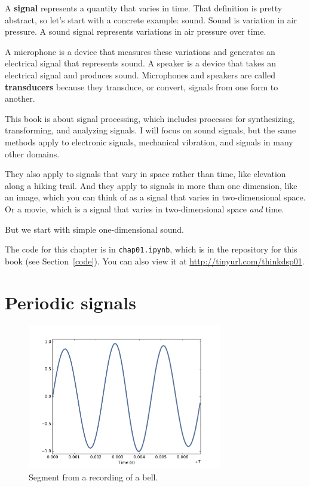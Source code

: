 \documentclass[12pt]{book}
\begin{document}
A {\bf signal} represents a quantity that varies in time.  That
definition is pretty abstract, so let's start with a concrete example:
sound.  Sound is variation in air pressure.  A sound signal represents
variations in air pressure over time.

A microphone is a device that measures these variations and generates
an electrical signal that represents sound.  A speaker is a device
that takes an electrical signal and produces sound.
Microphones and speakers are called {\bf transducers} because they
transduce, or convert, signals from one form to another.

This book is about signal processing, which includes processes for
synthesizing, transforming, and analyzing signals.  I will focus on
sound signals, but the same methods apply to electronic signals,
mechanical vibration, and signals in many other domains.

They also apply to signals that vary in space rather than time, like
elevation along a hiking trail.  And they apply to signals in more
than one dimension, like an image, which you can think of as a signal
that varies in two-dimensional space.  Or a movie, which is
a signal that varies in two-dimensional space {\it and} time.

But we start with simple one-dimensional sound.

The code for this chapter is in {\tt chap01.ipynb}, which is in the
repository for this book (see Section~\ref{code}).
You can also view it at \url{http://tinyurl.com/thinkdsp01}.


\section{Periodic signals}
\label{violin}

\begin{figure}
\centerline{\includegraphics[height=2.5in]{figs/sounds1.pdf}}
\caption{Segment from a recording of a bell.}
\label{fig.sounds1}
\end{figure}
\end{document}
